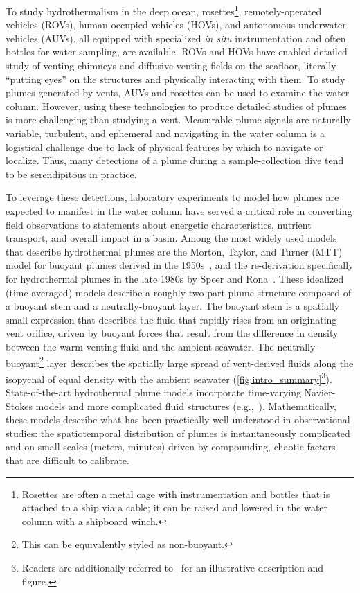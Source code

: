 To study hydrothermalism in the deep ocean, rosettes\footnote{Rosettes are often a metal cage with instrumentation and bottles that is attached to a ship via a cable; it can be raised and lowered in the water column with a shipboard winch.}, remotely-operated vehicles (ROVs), human occupied vehicles (HOVs), and autonomous underwater vehicles (AUVs), all equipped with specialized \emph{in situ} instrumentation and often bottles for water sampling, are available.
ROVs and HOVs have enabled detailed study of venting chimneys and diffusive venting fields on the seafloor, literally ``putting eyes'' on the structures and physically interacting with them.
To study plumes generated by vents, AUVs and rosettes can be used to examine the water column.
However, using these technologies to produce detailed studies of plumes is more challenging than studying a vent.
Measurable plume signals are naturally variable, turbulent, and ephemeral and navigating in the water column is a logistical challenge due to lack of physical features by which to navigate or localize. 
Thus, many detections of a plume during a sample-collection dive tend to be serendipitous in practice.

To leverage these detections, laboratory experiments to model how plumes are expected to manifest in the water column have served a critical role in converting field observations to statements about energetic characteristics, nutrient transport, and overall impact in a basin.
Among the most widely used models that describe hydrothermal plumes are the Morton, Taylor, and Turner (MTT) model for buoyant plumes derived in the 1950s~\autocite{morton1956turbulent}, and the re-derivation specifically for hydrothermal plumes in the late 1980s by Speer and Rona~\autocite{speer1989model}.
These idealized (time-averaged) models describe a roughly two part plume structure composed of a buoyant stem and a neutrally-buoyant layer. 
The buoyant stem is a spatially small expression that describes the fluid that rapidly rises from an originating vent orifice, driven by buoyant forces that result from the difference in density between the warm venting fluid and the ambient seawater.
The neutrally-buoyant\footnote{This can be equivalently styled as non-buoyant.} layer describes the spatially large spread of vent-derived fluids along the isopycnal of equal density with the ambient seawater (\cref{fig:intro_summary}\footnote{Readers are additionally referred to~\cite{yoerger2007autonomous} for an illustrative description and figure.}). 
State-of-the-art hydrothermal plume models incorporate time-varying Navier-Stokes models and more complicated fluid structures (e.g.,~\cite{lavelle2013turbulent,xu2012deep}).
Mathematically, these models describe what has been practically well-understood in observational studies: the spatiotemporal distribution of plumes is instantaneously complicated and on small scales (meters, minutes) driven by compounding, chaotic factors that are difficult to calibrate.



